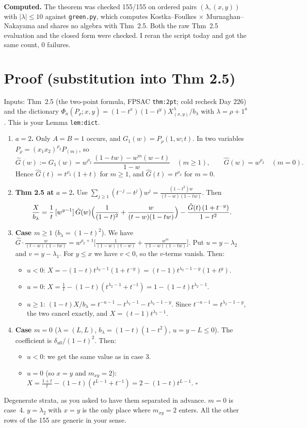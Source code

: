 \documentclass[10pt]{article}
\begin{document}
\textbf{Computed.} The theorem was checked 155/155 on ordered pairs $(\lambda,(x,y))$ with $|\lambda|\le10$ against \texttt{green.py},
which computes Kostka--Foulkes $\times$ Murnaghan--Nakayama and shares no algebra with Thm~2.5.
Both the raw Thm~2.5 evaluation and the closed form were checked. I reran the script today and got the same count, 0 failures.

\section{Proof (substitution into Thm 2.5)}
Inputs: Thm~2.5 (the two-point formula, FPSAC \texttt{thm:2pt}; cold recheck Day 226) and the dictionary
$\Phi_a(P_\rho;x,y)=(1-t^x)(1-t^y)X^\lambda_{(x,y)}/b_\lambda$ with $\lambda=\rho+1^a$. This is your Lemma \texttt{lem:dict}.
\begin{enumerate}
\item \textbf{$a=2$.} Only $A=B=1$ occurs, and $G_1(w)=P_\rho(1,w;t)$. In two variables $P_\rho=(x_1x_2)^{\rho_2}P_{(m)}$, so
\[
\hat G(w):=G_1(w)=w^{\rho_2}\,\frac{(1-tw)-w^m(w-t)}{1-w}\quad(m\ge1),\qquad \hat G(w)=w^{\rho_2}\quad(m=0).
\]
Hence $\hat G(t)=t^{\rho_2}(1+t)$ for $m\ge1$, and $\hat G(t)=t^{\rho_2}$ for $m=0$.
\item \textbf{Thm 2.5 at $a=2$.} Use $\sum_{j\ge1}(t^{-j}-t^j)w^j=\frac{(1-t^2)w}{(t-w)(1-tw)}$. Then
\[
\frac{X}{b_\lambda}=\frac1t\,[w^{y-1}]\,\hat G(w)\Bigl(\frac1{(1-t)^2}+\frac{w}{(t-w)(1-tw)}\Bigr)-\frac{\hat G(t)\,(1+t^{-y})}{1-t^2}.
\]
\item \textbf{Case $m\ge1$} ($b_\lambda=(1-t)^2$). We have $\hat G\cdot\frac{w}{(t-w)(1-tw)}=w^{\rho_2+1}\bigl[\frac1{(1-w)(t-w)}+\frac{w^m}{(1-w)(1-tw)}\bigr]$.
Put $u=y-\lambda_2$ and $v=y-\lambda_1$. For $y\le x$ we have $v<0$, so the $v$-terms vanish. Then:
\begin{itemize}
\item $u<0$: $X=-(1-t)t^{\lambda_2-1}(1+t^{-y})=(t-1)t^{\lambda_2-1-y}(1+t^y)$.
\item $u=0$: $X=\tfrac1t-(1-t)(t^{\lambda_2-1}+t^{-1})=1-(1-t)t^{\lambda_2-1}$.
\item $u\ge1$: $(1-t)X/b_\lambda=t^{-u-1}-t^{\lambda_2-1}-t^{\lambda_2-1-y}$. Since $t^{-u-1}=t^{\lambda_2-1-y}$, the two cancel exactly, and $X=(t-1)t^{\lambda_2-1}$.
\end{itemize}
\item \textbf{Case $m=0$} ($\lambda=(L,L)$, $b_\lambda=(1-t)(1-t^2)$, $u=y-L\le0$). The coefficient is $\delta_{u0}/(1-t)^2$. Then:
\begin{itemize}
\item $u<0$: we get the same value as in case 3.
\item $u=0$ (so $x=y$ and $m_{xy}=2$): $X=\tfrac{1+t}{t}-(1-t)(t^{L-1}+t^{-1})=2-(1-t)t^{L-1}$. \hfill$\square$
\end{itemize}
\end{enumerate}
Degenerate strata, as you asked to have them separated in advance. $m=0$ is case~4. $y=\lambda_2$ with $x=y$ is the only place where $m_{xy}=2$ enters.
All the other rows of the 155 are generic in your sense.
\end{document}
